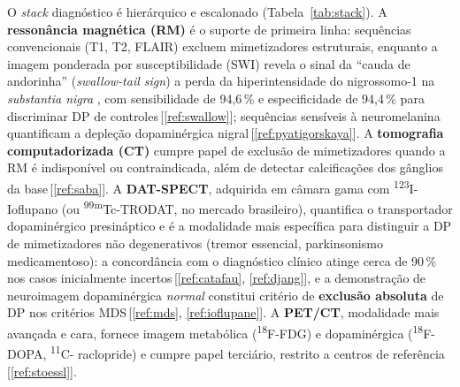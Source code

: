 \documentclass[12pt,a4paper,oneside]{article}
\begin{document}
O \textit{stack} diagnóstico é hierárquico e escalonado
(Tabela~\ref{tab:stack}). A \textbf{ressonância magnética (RM)} é o
suporte de primeira linha: sequências convencionais (T1, T2, FLAIR)
excluem mimetizadores estruturais, enquanto a imagem ponderada por
susceptibilidade (SWI) revela o sinal da ``cauda de andorinha''
(\textit{swallow-tail sign}) \textemdash{} a perda da hiperintensidade
do nigrossomo-1 na \textit{substantia nigra} \textemdash{}, com
sensibilidade de 94,6\,\% e especificidade de 94,4\,\% para
discriminar DP de controles\,[\ref{ref:swallow}]; sequências
sensíveis à neuromelanina quantificam a depleção dopaminérgica
nigral\,[\ref{ref:pyatigorskaya}]. A \textbf{tomografia computadorizada
(CT)} cumpre papel de exclusão de mimetizadores quando a RM é
indisponível ou contraindicada, além de detectar calcificações dos
gânglios da base\,[\ref{ref:saba}]. A \textbf{DAT-SPECT}, adquirida
em câmara gama com \textsuperscript{123}I-Ioflupano (ou
\textsuperscript{99m}Tc-TRODAT, no mercado brasileiro), quantifica o
transportador dopaminérgico presináptico e é a modalidade mais
específica para distinguir a DP de mimetizadores não degenerativos
(tremor essencial, parkinsonismo medicamentoso): a concordância com o
diagnóstico clínico atinge cerca de 90\,\% nos casos inicialmente
incertos\,[\ref{ref:catafau}, \ref{ref:djang}], e a demonstração de
neuroimagem dopaminérgica \textit{normal} constitui critério de
\textbf{exclusão absoluta} de DP nos critérios MDS\,[\ref{ref:mds},
\ref{ref:ioflupane}]. A \textbf{PET/CT}, modalidade mais avançada e
cara, fornece imagem metabólica (\textsuperscript{18}F-FDG) e
dopaminérgica (\textsuperscript{18}F-DOPA, \textsuperscript{11}C-
raclopride) e cumpre papel terciário, restrito a centros de
referência\,[\ref{ref:stoessl}].
\end{document}
